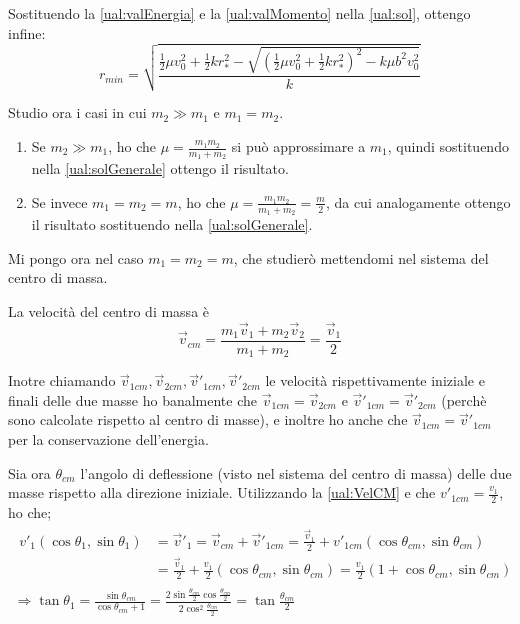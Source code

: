 \documentclass[../main.tex]{subfiles}
\begin{document}
Sostituendo la \cref{ual:valEnergia} e la \cref{ual:valMomento} nella \cref{ual:sol}, ottengo infine:
\begin{equation} \label{ual:solGenerale}
	r_{min}=\sqrt{\frac{\frac12\mu v_0^2+\frac12 kr_*^2-\sqrt{(\frac12\mu v_0^2+\frac12 kr_*^2)^2-k\mu b^2v_0^2}}{k}}
\end{equation}

Studio ora i casi in cui $m_2\gg m_1$ e $m_1=m_2$.
\begin{enumerate}
	\item Se $m_2\gg m_1$, ho che $\mu=\frac{m_1m_2}{m_1+m_2}$ si può approssimare a $m_1$, quindi sostituendo nella \cref{ual:solGenerale} ottengo il risultato. 
	\item Se invece $m_1=m_2=m$, ho che $\mu=\frac{m_1m_2}{m_1+m_2}=\frac m2$, da cui analogamente ottengo il risultato sostituendo nella \cref{ual:solGenerale}.
\end{enumerate}

Mi pongo ora nel caso $m_1=m_2=m$, che studierò mettendomi nel sistema del centro di massa.

La velocità del centro di massa è
\begin{equation}\label{ual:VelCM}
	\vec{v}_{cm}=\frac{m_1\vec v_1+m_2 \vec v_2}{m_1+m_2}=\frac{\vec v_1}{2}
\end{equation}

Inotre chiamando $\vec v_{1cm},\vec v_{2cm},\vec v'_{1cm},\vec v'_{2cm}$ le velocità rispettivamente iniziale e finali delle due masse ho banalmente che $\vec v_{1cm} = \vec v_{2cm}$ e $\vec v'_{1cm}=\vec v'_{2cm}$ (perchè sono calcolate rispetto al centro di masse), e inoltre ho anche che $\vec v_{1cm}=\vec v'_{1cm}$ per la conservazione dell'energia.

Sia ora $\theta_{cm}$ l'angolo di deflessione (visto nel sistema del centro di massa) delle due masse rispetto alla direzione iniziale. Utilizzando la \cref{ual:VelCM} e che $v'_{1cm}=\frac{v_1}{2}$, ho che;
\begin{gather*}
\begin{split}
	v'_1(\cos\theta_1,\sin\theta_1)& =\vec v'_1 =\vec v_{cm}+\vec v'_{1cm}=\frac{\vec v_1}{2}+v'_{1cm}(\cos\theta_{cm},\sin\theta_{cm})\\
	&=\frac{\vec v_1}{2}+\frac{v_1}{2}(\cos\theta_{cm},\sin\theta_{cm})=\frac{v_1}2(1+\cos\theta_{cm},\sin\theta_{cm})
\end{split}\\
\Longrightarrow \tan \theta_1=\frac{\sin\theta_{cm}}{\cos\theta_{cm}+1}=\frac{2\sin\frac{\theta_{cm}}2 \cos\frac{\theta_{cm}}2}{2\cos^2\frac{\theta_{cm}}2}=\tan \frac{\theta_{cm}}2
\end{gather*}
\end{document}
